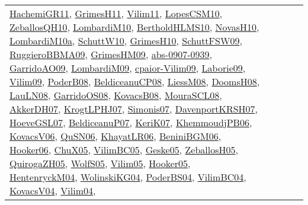 {\begin{longtable}{lp{3cm}>{\raggedright}p{6cm}>{\raggedright}p{6cm}p{8cm}}
\href{articles/HachemiGR11.pdf}{HachemiGR11}\cite{HachemiGR11}, \href{papers/GrimesH11.pdf}{GrimesH11}\cite{GrimesH11}, \href{papers/Vilim11.pdf}{Vilim11}\cite{Vilim11}, \href{articles/LopesCSM10.pdf}{LopesCSM10}\cite{LopesCSM10}, \href{articles/ZeballosQH10.pdf}{ZeballosQH10}\cite{ZeballosQH10}, \href{papers/LombardiM10.pdf}{LombardiM10}\cite{LombardiM10}, \href{papers/BertholdHLMS10.pdf}{BertholdHLMS10}\cite{BertholdHLMS10}, \href{articles/NovasH10.pdf}{NovasH10}\cite{NovasH10}, \href{articles/LombardiM10a.pdf}{LombardiM10a}\cite{LombardiM10a}, \href{papers/SchuttW10.pdf}{SchuttW10}\cite{SchuttW10}, \href{papers/GrimesH10.pdf}{GrimesH10}\cite{GrimesH10}, \href{papers/SchuttFSW09.pdf}{SchuttFSW09}\cite{SchuttFSW09}, \href{articles/RuggieroBBMA09.pdf}{RuggieroBBMA09}\cite{RuggieroBBMA09}, \href{papers/GrimesHM09.pdf}{GrimesHM09}\cite{GrimesHM09}, \href{articles/abs-0907-0939.pdf}{abs-0907-0939}\cite{abs-0907-0939}, \href{articles/GarridoAO09.pdf}{GarridoAO09}\cite{GarridoAO09}, \href{papers/LombardiM09.pdf}{LombardiM09}\cite{LombardiM09}, \href{papers/cpaior-Vilim09.pdf}{cpaior-Vilim09}\cite{cpaior-Vilim09}, \href{papers/Laborie09.pdf}{Laborie09}\cite{Laborie09}, \href{papers/Vilim09.pdf}{Vilim09}\cite{Vilim09}, \href{papers/PoderB08.pdf}{PoderB08}\cite{PoderB08}, \href{papers/BeldiceanuCP08.pdf}{BeldiceanuCP08}\cite{BeldiceanuCP08}, \href{articles/LiessM08.pdf}{LiessM08}\cite{LiessM08}, \href{papers/DoomsH08.pdf}{DoomsH08}\cite{DoomsH08}, \href{papers/LauLN08.pdf}{LauLN08}\cite{LauLN08}, \href{articles/GarridoOS08.pdf}{GarridoOS08}\cite{GarridoOS08}, \href{articles/KovacsB08.pdf}{KovacsB08}\cite{KovacsB08}, \href{papers/MouraSCL08.pdf}{MouraSCL08}\cite{MouraSCL08}, \href{papers/AkkerDH07.pdf}{AkkerDH07}\cite{AkkerDH07}, \href{papers/KrogtLPHJ07.pdf}{KrogtLPHJ07}\cite{KrogtLPHJ07}, \href{articles/Simonis07.pdf}{Simonis07}\cite{Simonis07}, \href{papers/DavenportKRSH07.pdf}{DavenportKRSH07}\cite{DavenportKRSH07}, \href{papers/HoeveGSL07.pdf}{HoeveGSL07}\cite{HoeveGSL07}, \href{papers/BeldiceanuP07.pdf}{BeldiceanuP07}\cite{BeldiceanuP07}, \href{papers/KeriK07.pdf}{KeriK07}\cite{KeriK07}, \href{papers/KhemmoudjPB06.pdf}{KhemmoudjPB06}\cite{KhemmoudjPB06}, \href{papers/KovacsV06.pdf}{KovacsV06}\cite{KovacsV06}, \href{papers/QuSN06.pdf}{QuSN06}\cite{QuSN06}, \href{articles/KhayatLR06.pdf}{KhayatLR06}\cite{KhayatLR06}, \href{papers/BeniniBGM06.pdf}{BeniniBGM06}\cite{BeniniBGM06}, \href{articles/Hooker06.pdf}{Hooker06}\cite{Hooker06}, \href{papers/ChuX05.pdf}{ChuX05}\cite{ChuX05}, \href{articles/VilimBC05.pdf}{VilimBC05}\cite{VilimBC05}, \href{papers/Geske05.pdf}{Geske05}\cite{Geske05}, \href{articles/ZeballosH05.pdf}{ZeballosH05}\cite{ZeballosH05}, \href{papers/QuirogaZH05.pdf}{QuirogaZH05}\cite{QuirogaZH05}, \href{papers/WolfS05.pdf}{WolfS05}\cite{WolfS05}, \href{papers/Vilim05.pdf}{Vilim05}\cite{Vilim05}, \href{articles/Hooker05.pdf}{Hooker05}\cite{Hooker05}, \href{papers/HentenryckM04.pdf}{HentenryckM04}\cite{HentenryckM04}, \href{papers/WolinskiKG04.pdf}{WolinskiKG04}\cite{WolinskiKG04}, \href{articles/PoderBS04.pdf}{PoderBS04}\cite{PoderBS04}, \href{papers/VilimBC04.pdf}{VilimBC04}\cite{VilimBC04}, \href{papers/KovacsV04.pdf}{KovacsV04}\cite{KovacsV04}, \href{papers/Vilim04.pdf}{Vilim04}\cite{Vilim04}, 
\end{longtable}}
